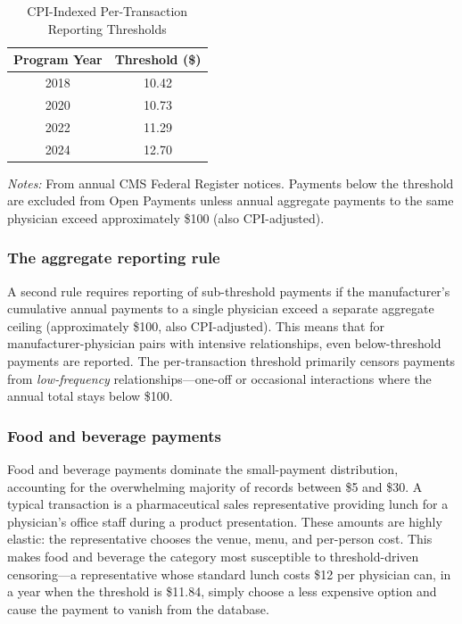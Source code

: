 \documentclass[12pt]{article}
\begin{document}
\begin{table}[H]
\centering
\caption{CPI-Indexed Per-Transaction Reporting Thresholds}
\label{tab:thresholds}
\begin{threeparttable}
\begin{tabular}{cc}
\toprule
Program Year & Threshold (\$) \\
\midrule
2018 & 10.42 \\
2020 & 10.73 \\
2022 & 11.29 \\
2024 & 12.70 \\
\bottomrule
\end{tabular}
\begin{tablenotes}[flushleft]
\small
\item \textit{Notes:} From annual CMS Federal Register notices. Payments below the threshold are excluded from Open Payments unless annual aggregate payments to the same physician exceed approximately \$100 (also CPI-adjusted).
\end{tablenotes}
\end{threeparttable}
\end{table}

\subsubsection*{The aggregate reporting rule} A second rule requires reporting of sub-threshold payments if the manufacturer's cumulative annual payments to a single physician exceed a separate aggregate ceiling (approximately \$100, also CPI-adjusted). This means that for manufacturer-physician pairs with intensive relationships, even below-threshold payments are reported. The per-transaction threshold primarily censors payments from \emph{low-frequency} relationships---one-off or occasional interactions where the annual total stays below \$100.

\subsubsection*{Food and beverage payments} Food and beverage payments dominate the small-payment distribution, accounting for the overwhelming majority of records between \$5 and \$30. A typical transaction is a pharmaceutical sales representative providing lunch for a physician's office staff during a product presentation. These amounts are highly elastic: the representative chooses the venue, menu, and per-person cost. This makes food and beverage the category most susceptible to threshold-driven censoring---a representative whose standard lunch costs \$12 per physician can, in a year when the threshold is \$11.84, simply choose a less expensive option and cause the payment to vanish from the database.
\end{document}
